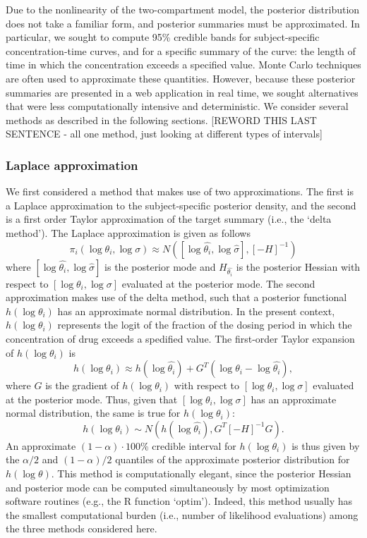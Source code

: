 \documentclass{article}\usepackage[]{graphicx}\usepackage[]{color}
\begin{document}
Due to the nonlinearity of the two-compartment model, the posterior distribution does not take a familiar form, and posterior summaries must be approximated. In particular, we sought to compute 95\% credible bands for subject-specific concentration-time curves, and for a specific summary of the curve: the length of time in which the concentration exceeds a specified value. Monte Carlo techniques are often used to approximate these quantities. However, because these posterior summaries are presented in a web application in real time, we sought alternatives that were less computationally intensive and deterministic. We consider several methods as described in the following sections. [REWORD THIS LAST SENTENCE - all one method, just looking at different types of intervals]


\subsubsection{Laplace approximation}
We first considered a method that makes use of two approximations. The first is a Laplace approximation to the subject-specific posterior density, and the second is a first order Taylor approximation of the target summary (i.e., the `delta method'). The Laplace approximation is given as follows
$$\pi_i(\log \theta_i, \log \sigma) \approx N([\log \hat{\theta_i},\log \hat{\sigma}], [-H]^{-1})$$
\noindent where $[\log \hat{\theta_i},\log \hat{\sigma}]$ is the posterior mode and $H_{\hat{\theta_i}}$ is the posterior Hessian with respect to $[\log \theta_i, \log \sigma]$ evaluated at the posterior mode. The second approximation makes use of the delta method, such that a posterior functional $h(\log \theta_i)$ has an approximate normal distribution. In the present context, $h(\log \theta_i)$ represents the logit of the fraction of the dosing period in which the concentration of drug exceeds a spedified value. The first-order Taylor expansion of $h(\log \theta_i)$ is
\begin{displaymath}
h(\log \theta_i) \approx  h(\log \hat{\theta_i}) + G^T(\log \theta_i - \log \hat{\theta_i}),
\end{displaymath}
\noindent where $G$ is the gradient of $h(\log \theta_i)$ with respect to $[\log \theta_i, \log \sigma]$ evaluated at the posterior mode. Thus, given that $[\log \theta_i, \log \sigma]$ has an approximate normal distribution, the same is true for $h(\log \theta_i)$:
\begin{displaymath}
h(\log \theta_i) \sim N(h(\log \hat{\theta_i}), G^T[-H]^{-1}G).
\end{displaymath}
\noindent An approximate $(1-\alpha)\cdot 100$\% credible interval for $h(\log \theta_i)$ is thus given by the $\alpha/2$ and $(1-\alpha)/2$ quantiles of the approximate posterior distribution for $h(\log \theta)$. This method is computationally elegant, since the posterior Hessian and posterior mode can be computed simultaneously by most optimization software routines (e.g., the R function `optim'). Indeed, this method usually has the smallest computational burden (i.e., number of likelihood evaluations) among the three methods considered here.
\end{document}
